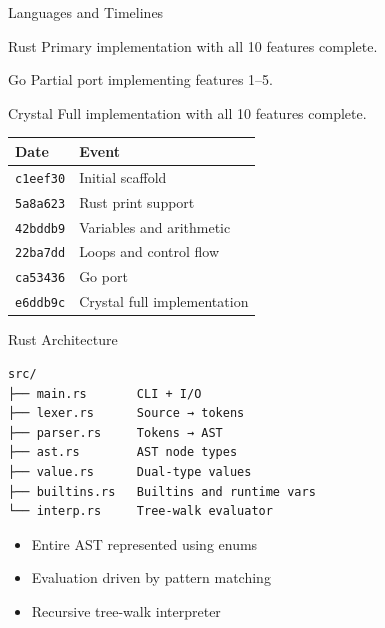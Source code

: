 \documentclass[aspectratio=169]{beamer}
\begin{document}
\begin{frame}{Languages and Timelines}

\begin{block}{Rust}
Primary implementation with all 10 features complete.
\end{block}

\begin{block}{Go}
Partial port implementing features 1--5.
\end{block}

\begin{block}{Crystal}
Full implementation with all 10 features complete.
\end{block}

\vspace{1em}

\begin{table}
\small
\begin{tabular}{ll}
\toprule
Date & Event \\
\midrule
\texttt{c1eef30} & Initial scaffold \\
\texttt{5a8a623} & Rust print support \\
\texttt{42bddb9} & Variables and arithmetic \\
\texttt{22ba7dd} & Loops and control flow \\
\texttt{ca53436} & Go port \\
\texttt{e6ddb9c} & Crystal full implementation \\
\bottomrule
\end{tabular}
\end{table}

\end{frame}

\begin{frame}[fragile]{Rust Architecture}

\begin{lstlisting}
src/
├── main.rs       CLI + I/O
├── lexer.rs      Source → tokens
├── parser.rs     Tokens → AST
├── ast.rs        AST node types
├── value.rs      Dual-type values
├── builtins.rs   Builtins and runtime vars
└── interp.rs     Tree-walk evaluator
\end{lstlisting}

\vspace{0.8em}

\begin{itemize}
  \item Entire AST represented using enums
  \item Evaluation driven by pattern matching
  \item Recursive tree-walk interpreter
\end{itemize}

\end{frame}
\end{document}

